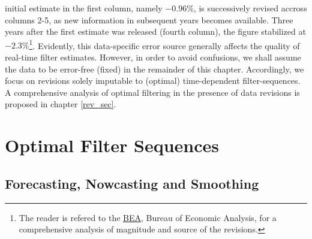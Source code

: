 \documentclass[a4paper]{book}
\begin{document}
initial estimate in the first column, namely $ -0.96 \%$, is successively {revised} accross columns 2-5, as new information in subsequent years becomes available. Three years after the first estimate was released (fourth column), the figure stabilized at $-2.3\%$\footnote{The reader is refered to the \href{http://www.bea.gov}{BEA}, Bureau of Economic Analysis, for a comprehensive analysis of magnitude and source of the revisions.}. Evidently, this data-specific error source generally affects the quality of real-time filter estimates. However, in order to avoid confusions,  we shall assume the data to be error-free (fixed) in the remainder of this chapter. Accordingly, we focus on revisions solely imputable to (optimal) time-dependent filter-sequences. A comprehensive analysis of optimal filtering in the presence of data revisions is proposed in chapter \ref{rev_sec}.  




\section{Optimal Filter Sequences}\label{filter_revi}




\subsection{Forecasting, Nowcasting and Smoothing}\label{for_now_smo}
\end{document}

